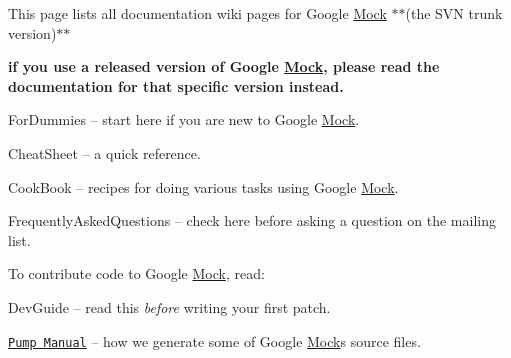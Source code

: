 This page lists all documentation wiki pages for Google \hyperlink{class_mock}{Mock} $\ast$$\ast$(the S\+VN trunk version)$\ast$$\ast$
\begin{DoxyItemize}
\item {\bfseries if you use a released version of Google \hyperlink{class_mock}{Mock}, please read the documentation for that specific version instead.}
\begin{DoxyItemize}
\item For\+Dummies -- start here if you are new to Google \hyperlink{class_mock}{Mock}.
\item Cheat\+Sheet -- a quick reference.
\item Cook\+Book -- recipes for doing various tasks using Google \hyperlink{class_mock}{Mock}.
\item Frequently\+Asked\+Questions -- check here before asking a question on the mailing list.
\end{DoxyItemize}
\end{DoxyItemize}

To contribute code to Google \hyperlink{class_mock}{Mock}, read\+:


\begin{DoxyItemize}
\item Dev\+Guide -- read this {\itshape before} writing your first patch.
\item \href{http://code.google.com/p/googletest/wiki/PumpManual}{\tt Pump Manual} -- how we generate some of Google \hyperlink{class_mock}{Mock}\textquotesingle{}s source files. 
\end{DoxyItemize}